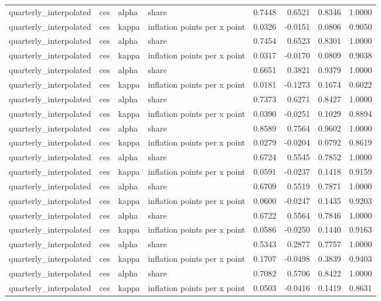 \begin{tabular}{llllrrrr}
quarterly\_interpolated & ces & alpha & share & 0.7448 & 0.6521 & 0.8346 & 1.0000 \\
quarterly\_interpolated & ces & kappa & inflation points per x point & 0.0326 & -0.0151 & 0.0806 & 0.9050 \\
quarterly\_interpolated & ces & alpha & share & 0.7454 & 0.6523 & 0.8301 & 1.0000 \\
quarterly\_interpolated & ces & kappa & inflation points per x point & 0.0317 & -0.0170 & 0.0809 & 0.9038 \\
quarterly\_interpolated & ces & alpha & share & 0.6651 & 0.3821 & 0.9379 & 1.0000 \\
quarterly\_interpolated & ces & kappa & inflation points per x point & 0.0181 & -0.1273 & 0.1674 & 0.6022 \\
quarterly\_interpolated & ces & alpha & share & 0.7373 & 0.6271 & 0.8427 & 1.0000 \\
quarterly\_interpolated & ces & kappa & inflation points per x point & 0.0390 & -0.0251 & 0.1029 & 0.8894 \\
quarterly\_interpolated & ces & alpha & share & 0.8589 & 0.7564 & 0.9602 & 1.0000 \\
quarterly\_interpolated & ces & kappa & inflation points per x point & 0.0279 & -0.0204 & 0.0792 & 0.8619 \\
quarterly\_interpolated & ces & alpha & share & 0.6724 & 0.5545 & 0.7852 & 1.0000 \\
quarterly\_interpolated & ces & kappa & inflation points per x point & 0.0591 & -0.0237 & 0.1418 & 0.9159 \\
quarterly\_interpolated & ces & alpha & share & 0.6709 & 0.5519 & 0.7871 & 1.0000 \\
quarterly\_interpolated & ces & kappa & inflation points per x point & 0.0600 & -0.0247 & 0.1435 & 0.9203 \\
quarterly\_interpolated & ces & alpha & share & 0.6722 & 0.5564 & 0.7846 & 1.0000 \\
quarterly\_interpolated & ces & kappa & inflation points per x point & 0.0586 & -0.0250 & 0.1440 & 0.9163 \\
quarterly\_interpolated & ces & alpha & share & 0.5343 & 0.2877 & 0.7757 & 1.0000 \\
quarterly\_interpolated & ces & kappa & inflation points per x point & 0.1707 & -0.0498 & 0.3839 & 0.9403 \\
quarterly\_interpolated & ces & alpha & share & 0.7082 & 0.5706 & 0.8422 & 1.0000 \\
quarterly\_interpolated & ces & kappa & inflation points per x point & 0.0503 & -0.0416 & 0.1419 & 0.8631 \\

\end{tabular}
